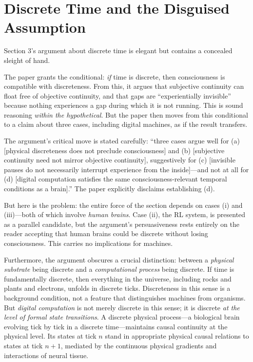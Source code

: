 \documentclass[11pt]{article}
\begin{document}
\section{Discrete Time and the Disguised Assumption}

Section 3's argument about discrete time is elegant but contains a concealed sleight of hand.

The paper grants the conditional: \textit{if} time is discrete, then consciousness is compatible with discreteness. From this, it argues that subjective continuity can float free of objective continuity, and that gaps are ``experientially invisible'' because nothing experiences a gap during which it is not running. This is sound reasoning \textit{within the hypothetical}. But the paper then moves from this conditional to a claim about three cases, including digital machines, as if the result transfers.

The argument's critical move is stated carefully: ``three cases argue well for (a) [physical discreteness does not preclude consciousness] and (b) [subjective continuity need not mirror objective continuity], suggestively for (c) [invisible pauses do not necessarily interrupt experience from the inside]---and not at all for (d) [digital computation satisfies the same consciousness-relevant temporal conditions as a brain].'' The paper explicitly disclaims establishing (d).

But here is the problem: the entire force of the section depends on cases (i) and (iii)---both of which involve \textit{human brains}. Case (ii), the RL system, is presented as a parallel candidate, but the argument's persuasiveness rests entirely on the reader accepting that human brains could be discrete without losing consciousness. This carries no implications for machines.

Furthermore, the argument obscures a crucial distinction: between a \textit{physical substrate} being discrete and a \textit{computational process} being discrete. If time is fundamentally discrete, then everything in the universe, including rocks and plants and electrons, unfolds in discrete ticks. Discreteness in this sense is a background condition, not a feature that distinguishes machines from organisms. But \textit{digital computation} is not merely discrete in this sense; it is discrete \textit{at the level of formal state transitions}. A discrete physical process---a biological brain evolving tick by tick in a discrete time---maintains causal continuity at the physical level. Its states at tick $n$ stand in appropriate physical causal relations to states at tick $n+1$, mediated by the continuous physical gradients and interactions of neural tissue.
\end{document}

